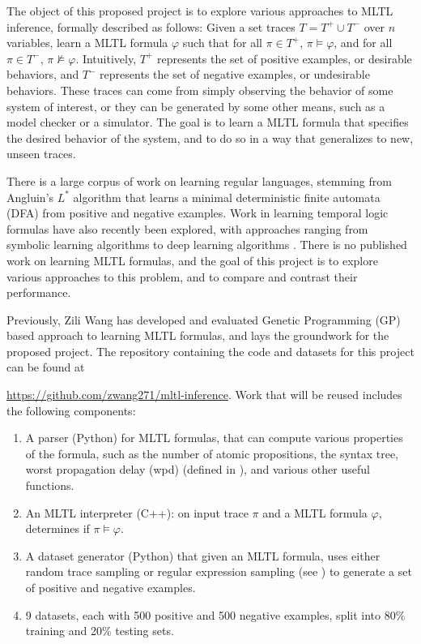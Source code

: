 \documentclass[12pt]{article}
\renewcommand{\phi}{\varphi}
\begin{document}
The object of this proposed project is to explore various approaches to MLTL inference, formally described as follows: 
Given a set traces $T = T^+ \cup T^-$ over $n$ variables, learn a MLTL formula $\phi$ such that for all $\pi \in T^+$, $\pi \models \phi$, and for all $\pi \in T^-$, $\pi \not\models \phi$. 
Intuitively, $T^+$ represents the set of positive examples, or desirable behaviors, and $T^-$ represents the set of negative examples, or undesirable behaviors.
These traces can come from simply observing the behavior of some system of interest, or they can be generated by some other means, such as a model checker or a simulator.
The goal is to learn a MLTL formula that specifies the desired behavior of the system, and to do so in a way that generalizes to new, unseen traces.

There is a large corpus of work on learning regular languages, stemming from Angluin's $L^*$ algorithm \cite{ANGLUIN_Lstar} that learns a minimal deterministic finite automata (DFA) from positive and negative examples. Work in learning temporal logic formulas have also recently been explored, with approaches ranging from symbolic learning algorithms \cite{roy_ltlf_learning, camacho_ltlf_learning} to deep learning algorithms \cite{stl_learning, Luo_Liang_Du_Wan_Peng_Zhang_2022}.
There is no published work on learning MLTL formulas, and the goal of this project is to explore various approaches to this problem, and to compare and contrast their performance.

Previously, Zili Wang has developed and evaluated Genetic Programming (GP) based approach to learning MLTL formulas, and lays the groundwork for the proposed project.
The repository containing the code and datasets for this project can be found at 

\noindent \url{https://github.com/zwang271/mltl-inference}.
Work that will be reused includes the following components:
\begin{enumerate}
  \item A parser (Python) for MLTL formulas, that can compute various properties of the formula, such as the number of atomic propositions, the syntax tree, worst propagation delay (wpd) (defined in \cite{KZJZR20}), and various other useful functions.  
  \item An MLTL interpreter (C++): on input trace $\pi$ and a MLTL formula $\phi$, determines if $\pi \models \phi$.
  \item A dataset generator (Python) that given an MLTL formula, uses either random trace sampling or regular expression sampling (see \cite{WEST-iFM23}) to generate a set of positive and negative examples.
  \item 9 datasets, each with 500 positive and 500 negative examples, split into 80\% training and 20\% testing sets.
\end{enumerate}
\end{document}
